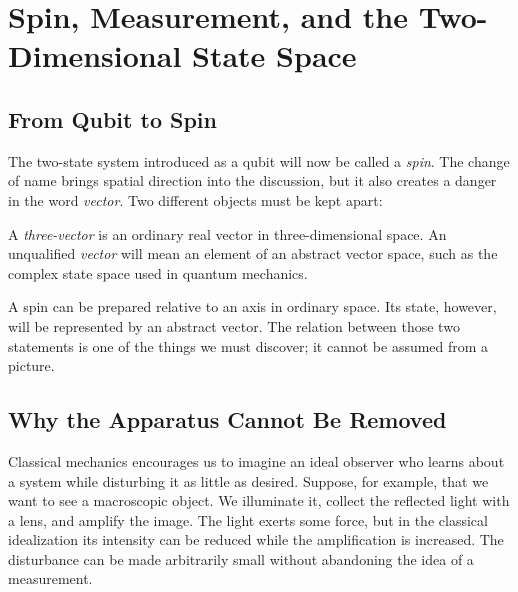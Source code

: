 \chapter{Spin, Measurement, and the Two-Dimensional State Space}


\section{From Qubit to Spin}

The two-state system introduced as a qubit will now be called a \emph{spin}. The change of name brings spatial direction into the discussion, but it also creates a danger in the word \emph{vector}. Two different objects must be kept apart:

\begin{definition}
A \emph{three-vector} is an ordinary real vector in three-dimensional space. An unqualified \emph{vector} will mean an element of an abstract vector space, such as the complex state space used in quantum mechanics.
\end{definition}

A spin can be prepared relative to an axis in ordinary space. Its state, however, will be represented by an abstract vector. The relation between those two statements is one of the things we must discover; it cannot be assumed from a picture.

\section{Why the Apparatus Cannot Be Removed}

Classical mechanics encourages us to imagine an ideal observer who learns about a system while disturbing it as little as desired. Suppose, for example, that we want to see a macroscopic object. We illuminate it, collect the reflected light with a lens, and amplify the image. The light exerts some force, but in the classical idealization its intensity can be reduced while the amplification is increased. The disturbance can be made arbitrarily small without abandoning the idea of a measurement.

